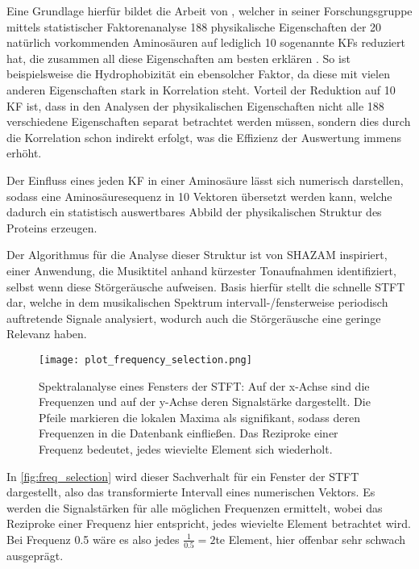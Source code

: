     Eine Grundlage hierfür bildet die Arbeit von \citeauthor{kidera}, welcher in seiner Forschungsgruppe mittels statistischer Faktorenanalyse 188 physikalische Eigenschaften der 20 natürlich vorkommenden Aminosäuren auf lediglich 10 sogenannte \acp{KF} reduziert hat, die zusammen all diese Eigenschaften am besten erklären . So ist beispielsweise die Hydrophobizität ein ebensolcher Faktor, da diese mit vielen anderen Eigenschaften stark in Korrelation steht. Vorteil der Reduktion auf 10 \ac{KF} ist, dass in den Analysen der physikalischen Eigenschaften nicht alle 188 verschiedene Eigenschaften separat betrachtet werden müssen, sondern dies durch die Korrelation schon indirekt erfolgt, was die Effizienz der Auswertung immens erhöht.

    Der Einfluss eines jeden \ac{KF} in einer Aminosäure lässt sich numerisch darstellen, sodass eine Aminosäuresequenz in 10 Vektoren übersetzt werden kann, welche dadurch ein statistisch auswertbares Abbild der physikalischen Struktur des Proteins erzeugen.

    Der Algorithmus für die Analyse dieser Struktur ist von SHAZAM inspiriert, einer Anwendung, die Musiktitel anhand kürzester Tonaufnahmen identifiziert, selbst wenn diese Störgeräusche aufweisen. Basis hierfür stellt die schnelle \ac{STFT} dar, welche in dem musikalischen Spektrum intervall-/fensterweise periodisch auftretende Signale analysiert, wodurch auch die Störgeräusche eine geringe Relevanz haben.

    \begin{figure}[H]
        \texttt{[image: plot\_frequency\_selection.png]}
        \caption[Spektralanalyse eines Intervalls/Fensters der STFT mit Markierung lokaler Maxima]{Spektralanalyse eines Fensters der STFT\@: Auf der x-Achse sind die Frequenzen und auf der y-Achse deren Signalstärke dargestellt. Die Pfeile markieren die lokalen Maxima als signifikant, sodass deren Frequenzen in die Datenbank einfließen. Das Reziproke einer Frequenz bedeutet, jedes wievielte Element sich wiederholt.}
        \label{fig:freq_selection}
    \end{figure}

    In \autoref{fig:freq_selection} wird dieser Sachverhalt für ein Fenster der \ac{STFT} dargestellt, also das transformierte Intervall eines numerischen Vektors. Es werden die Signalstärken für alle möglichen Frequenzen ermittelt, wobei das Reziproke einer Frequenz hier entspricht, jedes wievielte Element betrachtet wird. Bei Frequenz 0.5 wäre es also jedes $\frac{1}{0.5} = 2$te Element, hier offenbar sehr schwach ausgeprägt.

